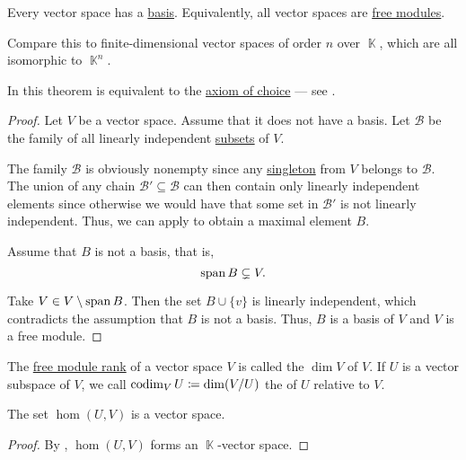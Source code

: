 \begin{theorem}\label{thm:every_vector_space_has_a_basis}
  Every vector space has a \hyperref[def:module_hamel_basis]{basis}. Equivalently, all vector spaces are \hyperref[def:free_semimodule]{free modules}.

  Compare this to finite-dimensional vector spaces of order \( n \) over \( \BbbK \), which are all isomorphic to \( \BbbK^n \).

  In \hyperref[def:zfc]{} this theorem is equivalent to the \hyperref[def:zfc/choice]{axiom of choice} --- see .
\end{theorem}
\begin{proof}
  Let \( V \) be a vector space. Assume that it does not have a basis. Let \( \mathcal{B} \) be the family of all linearly independent \hyperref[def:linear_combination]{subsets} of \( V \).

  The family \( \mathcal{B} \) is obviously nonempty since any \hyperref[rem:singleton_sets]{singleton} from \( V \) belongs to \( \mathcal{B} \). The union of any chain \( \mathcal{B}' \subseteq \mathcal{B} \) can then contain only linearly independent elements since otherwise we would have that some set in \( \mathcal{B}' \) is not linearly independent. Thus, we can apply  to obtain a maximal element \( B \).

  Assume that \( B \) is not a basis, that is,
  \begin{equation*}
    \operatorname{span} B \subsetneq V.
  \end{equation*}

  Take \( V \in V \setminus \operatorname{span} B \). Then the set \( B \cup \{ v \} \) is linearly independent, which contradicts the assumption that \( B \) is not a basis. Thus, \( B \) is a basis of \( V \) and \( V \) is a free module.
\end{proof}

\begin{definition}\label{def:vector_space_dimension}
  The \hyperref[def:free_semimodule]{free module rank} of a vector space \( V \) is called the  \( \dim V \) of \( V \). If \( U \) is a vector subspace of \( V \), we call \( \operatorname*{co\negthinspace\dim}_V U \coloneqq \dim(V/U) \) the  of \( U \) relative to \( V \).
\end{definition}

\begin{proposition}\label{thm:linear_maps_form_algebra}
  The set \( \hom(U, V) \) is a vector space.
\end{proposition}
\begin{proof}
  By , \( \hom(U, V) \) forms an \( \BbbK \)-vector space.
\end{proof}

